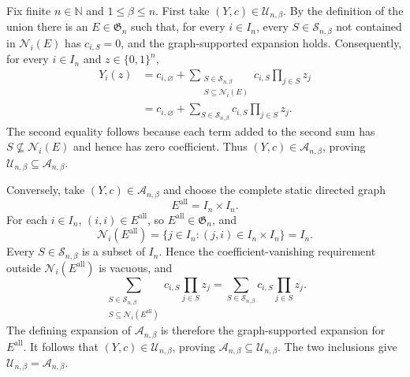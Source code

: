 Fix finite \(n\in\mathbb N\) and \(1\leq\beta\leq n\).  First take
\((Y,c)\in\mathcal U_{n,\beta}\).  By the definition of the union there is
an \(E\in\mathfrak G_n\) such that, for every \(i\in I_n\), every
\(S\in\mathcal S_{n,\beta}\) not contained in \(\mathcal N_i(E)\) has
\(c_{i,S}=0\), and the graph-supported expansion holds.  Consequently, for
every \(i\in I_n\) and \(z\in\{0,1\}^n\),
\[
\begin{aligned}
Y_i(z)
&=c_{i,\varnothing}
+\sum_{\substack{S\in\mathcal S_{n,\beta}\\S\subseteq\mathcal N_i(E)}}
c_{i,S}\prod_{j\in S}z_j\\
&=c_{i,\varnothing}
+\sum_{S\in\mathcal S_{n,\beta}}c_{i,S}\prod_{j\in S}z_j.
\end{aligned}
\]
The second equality follows because each term added to the second sum has
\(S\nsubseteq\mathcal N_i(E)\) and hence has zero coefficient.  Thus
\((Y,c)\in\mathcal A_{n,\beta}\), proving
\(\mathcal U_{n,\beta}\subseteq\mathcal A_{n,\beta}\).

Conversely, take \((Y,c)\in\mathcal A_{n,\beta}\) and choose the complete
static directed graph
\[
E^{\mathrm{all}}=I_n\times I_n.
\]
For each \(i\in I_n\), \((i,i)\in E^{\mathrm{all}}\), so
\(E^{\mathrm{all}}\in\mathfrak G_n\), and
\[
\mathcal N_i(E^{\mathrm{all}})
=\{j\in I_n:(j,i)\in I_n\times I_n\}
=I_n.
\]
Every \(S\in\mathcal S_{n,\beta}\) is a subset of \(I_n\).  Hence the
coefficient-vanishing requirement outside \(\mathcal N_i(E^{\mathrm{all}})\)
is vacuous, and
\[
\sum_{\substack{S\in\mathcal S_{n,\beta}\\
S\subseteq\mathcal N_i(E^{\mathrm{all}})}}
c_{i,S}\prod_{j\in S}z_j
=
\sum_{S\in\mathcal S_{n,\beta}}c_{i,S}\prod_{j\in S}z_j.
\]
The defining expansion of \(\mathcal A_{n,\beta}\) is therefore the
graph-supported expansion for \(E^{\mathrm{all}}\).  It follows that
\((Y,c)\in\mathcal U_{n,\beta}\), proving
\(\mathcal A_{n,\beta}\subseteq\mathcal U_{n,\beta}\).  The two inclusions
give \(\mathcal U_{n,\beta}=\mathcal A_{n,\beta}\).